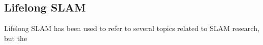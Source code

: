 \subsection{Lifelong SLAM}

Lifelong SLAM has been used to refer to several topics related to SLAM research, but the 